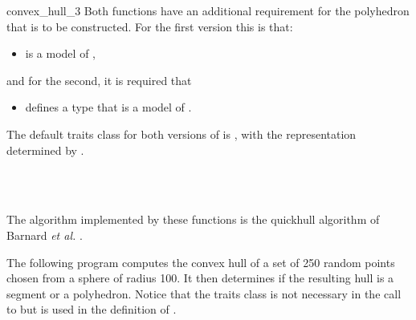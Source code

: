 \begin{ccRefFunction}{convex_hull_3}
Both functions have an additional requirement for the polyhedron that is
to be constructed. For the first version this is that:
\begin{itemize}
  \item {} is a model of ,
\end{itemize}
and for the second, it is required that
\begin{itemize}
 \item {} defines a type  that is a model of 
       .
\end{itemize}

The default traits class for both versions of  is 
,%
with the representation  determined by .

\ccSeeAlso

 \\
  \\

\ccImplementation
The algorithm implemented by these functions is the quickhull algorithm of 
Barnard \textit{et al.} \cite{bdh-qach-96}.  

\ccExample

The following program computes the convex hull of a set of 250 random
points chosen from a sphere of radius 100.  It then determines if the resulting
hull is a segment or a polyhedron.  Notice that the traits class is not
necessary in the call to  but is used in the definition
of .


\end{ccRefFunction}
